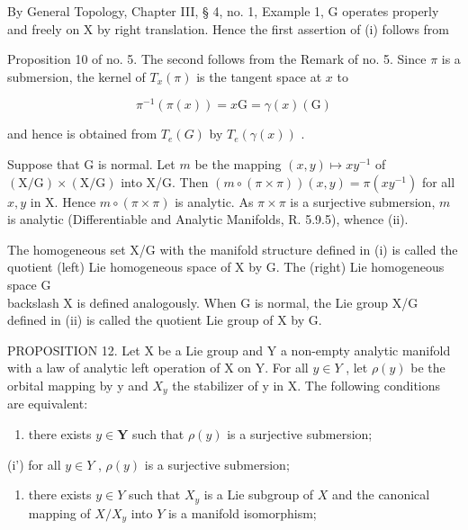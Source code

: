 By General Topology, Chapter III, § 4, no. 1, Example 1, G operates properly and freely on X by right translation. Hence the first assertion of (i) follows from

Proposition 10 of no. 5. The second follows from the Remark of no. 5. Since \(\pi\) is a submersion, the kernel of \(T_{x}(\pi)\) is the tangent space at \(x\) to

\[
\pi^ {- 1} (\pi (x)) = x \mathrm{G} = \gamma (x) (\mathrm{G})
\]

and hence is obtained from \(T_{e}(G)\) by \(T_{e}(\gamma(x))\) .

Suppose that G is normal. Let \(m\) be the mapping \((x,y)\mapsto xy^{-1}\) of \((\mathrm{X / G})\times (\mathrm{X / G})\) into X/G. Then \((m\circ (\pi \times \pi))(x,y) = \pi (xy^{-1})\) for all \(x,y\) in X. Hence \(m\circ (\pi \times \pi)\) is analytic. As \(\pi \times \pi\) is a surjective submersion, \(m\) is analytic (Differentiable and Analytic Manifolds, R. 5.9.5), whence (ii).

The homogeneous set X/G with the manifold structure defined in (i) is called the quotient (left) Lie homogeneous space of X by G. The (right) Lie homogeneous space G\\backslash X is defined analogously. When G is normal, the Lie group X/G defined in (ii) is called the quotient Lie group of X by G.

PROPOSITION 12. Let X be a Lie group and Y a non-empty analytic manifold with a law of analytic left operation of X on Y. For all \(y \in Y\) , let \(\rho(y)\) be the orbital mapping by y and \(X_{y}\) the stabilizer of y in X. The following conditions are equivalent:

\begin{enumerate}
\def\labelenumi{(\roman{enumi})}
\tightlist
\item
  there exists \(y \in \mathbf{Y}\) such that \(\rho(y)\) is a surjective submersion;
\end{enumerate}

(i') for all \(y \in Y\) , \(\rho(y)\) is a surjective submersion;

\begin{enumerate}
\def\labelenumi{(\roman{enumi})}
\setcounter{enumi}{1}
\tightlist
\item
  there exists \(y \in Y\) such that \(X_y\) is a Lie subgroup of \(X\) and the canonical mapping of \(X / X_y\) into \(Y\) is a manifold isomorphism;
\end{enumerate}


